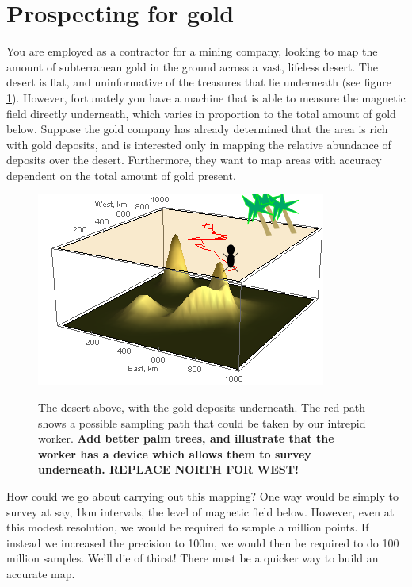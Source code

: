 \documentclass[11pt,fullpage]{book}
\begin{document}
\section{Prospecting for gold}\label{sec:metropolisHastings_gold}
You are employed as a contractor for a mining company, looking to map the amount of subterranean gold in the ground across a vast, lifeless desert. The desert is flat, and uninformative of the treasures that lie underneath (see figure \ref{fig:metropolisHastings_goldMineSimple}). However, fortunately you have a machine that is able to measure the magnetic field directly underneath, which varies in proportion to the total amount of gold below. Suppose the gold company has already determined that the area is rich with gold deposits, and is interested only in mapping the relative abundance of deposits over the desert. Furthermore, they want to map areas with accuracy dependent on the total amount of gold present.

\begin{figure}
\centering
\scalebox{0.8} 
{\includegraphics{metropolisHastings_goldMineSimple.png}}
\caption{The desert above, with the gold deposits underneath. The red path shows a possible sampling path that could be taken by our intrepid worker. \textbf{Add better palm trees, and illustrate that the worker has a device which allows them to survey underneath. REPLACE NORTH FOR WEST!}}\label{fig:metropolisHastings_goldMineSimple}
\end{figure}

How could we go about carrying out this mapping? One way would be simply to survey at say, 1km intervals, the level of magnetic field below. However, even at this modest resolution, we would be required to sample a million points. If instead we increased the precision to 100m, we would then be required to do 100 million samples. We'll die of thirst! There must be a quicker way to build an accurate map.
\end{document}
